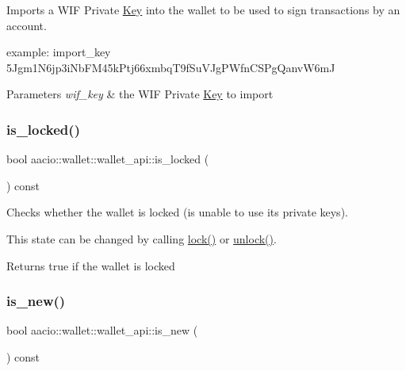 Imports a W\+IF Private \mbox{\hyperlink{struct_key}{Key}} into the wallet to be used to sign transactions by an account.

example\+: import\+\_\+key 5\+Jgm1\+N6jp3i\+Nb\+F\+M45k\+Ptj66xmbq\+T9f\+Su\+V\+Jg\+P\+Wfn\+C\+S\+Pg\+Qanv\+W6mJ


\begin{DoxyParams}{Parameters}
{\em wif\+\_\+key} & the W\+IF Private \mbox{\hyperlink{struct_key}{Key}} to import \\
\hline
\end{DoxyParams}
\mbox{\label{classaacio_1_1wallet_1_1wallet__api_aae6a962628df3f49cacaf2239ef0f11c}} 
\subsubsection{\texorpdfstring{is\+\_\+locked()}{is\_locked()}}
{\footnotesize\ttfamily bool aacio\+::wallet\+::wallet\+\_\+api\+::is\+\_\+locked (\begin{DoxyParamCaption}{ }\end{DoxyParamCaption}) const}

Checks whether the wallet is locked (is unable to use its private keys).

This state can be changed by calling {\ttfamily \mbox{\hyperlink{classaacio_1_1wallet_1_1wallet__api_a12f7c1fefda15e09c58c6622d9f1a32c}{lock()}}} or {\ttfamily \mbox{\hyperlink{classaacio_1_1wallet_1_1wallet__api_a80992e6f10f3172bd514d10287a69420}{unlock()}}}. \begin{DoxyReturn}{Returns}
true if the wallet is locked 
\end{DoxyReturn}
\mbox{\label{classaacio_1_1wallet_1_1wallet__api_a1e1cc3ffe35685070738d34d3a8778d9}} 
\subsubsection{\texorpdfstring{is\+\_\+new()}{is\_new()}}
{\footnotesize\ttfamily bool aacio\+::wallet\+::wallet\+\_\+api\+::is\+\_\+new (\begin{DoxyParamCaption}{ }\end{DoxyParamCaption}) const}

